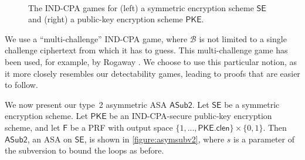 \begin{figure}
\centering
\begin{pchstack}
\vrule\
\end{pchstack}
\caption[The IND-CPA games for a symmetric encryption scheme $\mathsf{SE}$ and a public-key encryption scheme $\mathsf{PKE}$]{The IND-CPA games for (left) a symmetric encryption scheme $\mathsf{SE}$ and (right) a public-key encryption scheme $\mathsf{PKE}$.}
\label{game:indse}
\label{game:indpke}
\end{figure}

We use a ``multi-challenge'' IND-CPA game, where $\mathcal{B}$ is not limited to a single challenge ciphertext from which it has to guess. This multi-challenge game has been used, for example, by Rogaway \cite{FSE:Rogaway04}. We choose to use this particular notion, as it more closely resembles our detectability games, leading to proofs that are easier to follow.

We now present our type~2 asymmetric ASA $\mathsf{ASub2}$. Let $\mathsf{SE}$ be a symmetric encryption scheme. Let $\mathsf{PKE}$ be an IND-CPA-secure public-key encryption scheme, and let $\mathsf{F}$ be a PRF with output space $\{1,...,\mathsf{PKE.clen}\}\times \{0,1\}$. Then $\mathsf{ASub2}$, an ASA on $\mathsf{SE}$, is shown in \autoref{figure:asymsubv2}, where $s$ is a parameter of the subversion to bound the loops as before.

